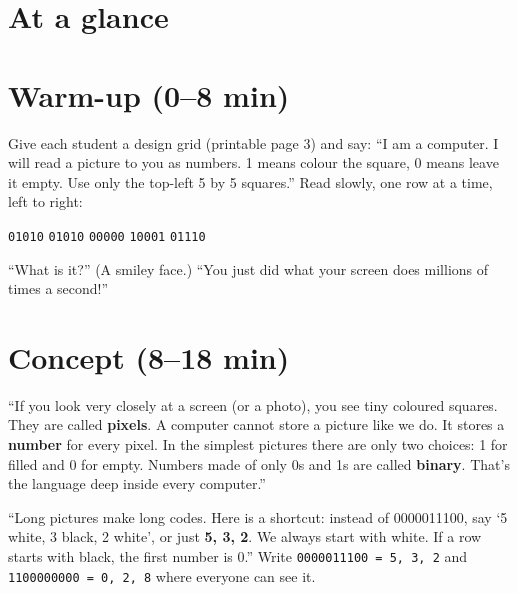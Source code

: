 \section{At a glance}
\begin{timeplan}
\end{timeplan}

\section{Warm-up (0--8 min)}
\begin{unplugged}
Give each student a design grid (printable page 3) and say: \enquote{I am a computer. I will read a picture to you as numbers. 1 means colour the square, 0 means leave it empty. Use only the top-left 5 by 5 squares.} Read slowly, one row at a time, left to right:
\begin{center}
\texttt{01010} \quad \texttt{01010} \quad \texttt{00000} \quad \texttt{10001} \quad \texttt{01110}
\end{center}
\enquote{What is it?} (A smiley face.) \enquote{You just did what your screen does millions of times a second!}
\end{unplugged}

\section{Concept (8--18 min)}
\begin{teacherscript}
\enquote{If you look very closely at a screen (or a photo), you see tiny coloured squares. They are called \textbf{pixels}. A computer cannot store a picture like we do. It stores a \textbf{number} for every pixel. In the simplest pictures there are only two choices: 1 for filled and 0 for empty. Numbers made of only 0s and 1s are called \textbf{binary}. That's the language deep inside every computer.}

\enquote{Long pictures make long codes. Here is a shortcut: instead of 0000011100, say \enquote{5 white, 3 black, 2 white}, or just \textbf{5, 3, 2}. We always start with white. If a row starts with black, the first number is 0.} Write \texttt{0000011100 = 5, 3, 2} and \texttt{1100000000 = 0, 2, 8} where everyone can see it.
\end{teacherscript}

